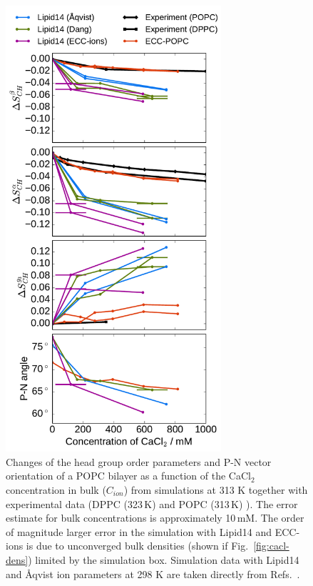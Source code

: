 \documentclass[journal=jpcbfk,manuscript=article]{achemso}
\begin{document}
\begin{figure}[htb!]
  \centering
  \includegraphics[width=8.0cm]{../Fig/ipython_nb/PN_angle_OrdPars-A-B-g3_L14-ECCL17_q80_sig89_CaCl.pdf}
  \caption{\label{fig:delta_ordPar_CaCl}
    Changes of the head group order parameters and P-N vector orientation of a POPC bilayer 
    as a function of the CaCl$_2$ concentration in bulk ($C_{ion}$)
    from simulations at 313 K together with experimental data 
    (DPPC (323\,K) \cite{akutsu81} and POPC (313\,K) \cite{altenbach84}). 
    The error estimate for bulk concentrations is approximately 10\,mM.
    The order of magnitude larger error in the
    simulation with Lipid14 and ECC-ions is due to unconverged bulk densities  (shown if Fig.~\ref{fig:cacl-dens}) limited by
    the simulation box. 
    Simulation data with Lipid14 and \AA{}qvist ion parameters at 298 K are taken directly from
    Refs.~.
  }
\end{figure}
\end{document}
